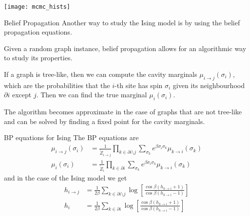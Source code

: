 \documentclass[handout]{beamer}
\begin{document}
\begin{frame}[plain]
    \centering
    \texttt{[image: mcmc\_hists]}
\end{frame}

\begin{frame}{Belief Propagation}
    Another way to study the Ising model is by using the \alert{belief
    propagation} equations.

    Given a random graph instance, belief propagation allows for an
    \alert{algorithmic} way to study its properties.

    If a graph is tree-like, then we can compute the \alert{cavity marginals}
    $\mu_{i\to j}(\sigma_i)$, which are the probabilities that the $i$-th site
    has spin $\sigma_i$ given its neighbourhood $\partial i$ except $j$.
    Then we can find the \alert{true marginal} $\mu_i(\sigma_i)$.

    The algorithm becomes approximate in the case of graphs that are not
    tree-like and can be solved by finding a fixed point for the cavity
    marginals.
\end{frame}

\begin{frame}{BP equations for Ising}
    The BP equations are
    \begin{align}
        \mu_{i\to j}(\sigma_i) &= \frac{1}{\tilde Z_{i\to j}} \prod_{k \in
        \partial i \setminus j} \sum_{\sigma_k} e^{\beta \sigma_i \sigma_k}
        \mu_{k\to i} (\sigma_k)\\
            \mu_i(\sigma_i) &= \frac{1}{\tilde Z_i} \prod_{k\in \partial i}
            \sum_{\sigma_k} e^{\beta \sigma_i \sigma_k} \mu_{k\to i} (\sigma_k)
    \end{align}
    and in the case of the Ising model we get
    \begin{align}
        h_{i\to j} &= \frac{1}{2\beta} \sum_{k\in \partial i \setminus j} \log
        \left[ \frac{\cos{\beta(h_{k\to i} +1)}}{\cos{\beta(h_{k\to i} -1)}}
        \right] \label{eq:ising_bp_cavity}\\
        h_{i} &= \frac{1}{2\beta} \sum_{k\in \partial i} \log
        \left[ \frac{\cos{\beta(h_{k\to i} +1)}}{\cos{\beta(h_{k\to i} -1)}}
        \right] \label{eq:ising_bp_field}
    \end{align}
\end{frame}
\end{document}
